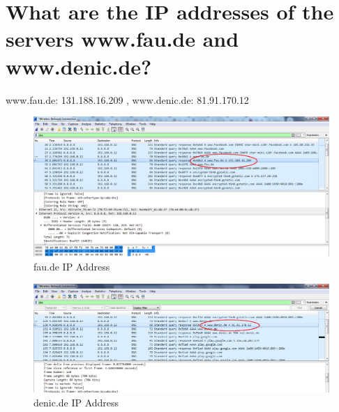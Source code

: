 \section{What are the IP addresses of the servers www.fau.de and www.denic.de?}

www.fau.de: 131.188.16.209 , 
www.denic.de: 81.91.170.12

\begin{figure}[H]
\centering
  \includegraphics[width=.9\textwidth]{Images/Task1_2_fau.de.png}
  \caption{fau.de IP Address}
  \label{fig:1.2}
\end{figure}



\begin{figure}[H]
\centering
  \includegraphics[width=.9\textwidth]{Images/Task1_2_denic.de.png}
  \caption{denic.de IP Address}
  \label{fig:1.3}
\end{figure}

